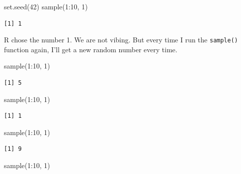 \documentclass[
  letterpaper,
  DIV=11,
  numbers=noendperiod,
  oneside]{scrreprt}
\newenvironment{Shaded}{\begin{snugshade}}{\end{snugshade}}
\newcommand{\DecValTok}[1]{\textcolor[rgb]{0.68,0.00,0.00}{#1}}
\newcommand{\FunctionTok}[1]{\textcolor[rgb]{0.28,0.35,0.67}{#1}}
\newcommand{\NormalTok}[1]{\textcolor[rgb]{0.00,0.23,0.31}{#1}}
\newcommand{\SpecialCharTok}[1]{\textcolor[rgb]{0.37,0.37,0.37}{#1}}
\begin{document}
\begin{Shaded}
\begin{Highlighting}[]
\FunctionTok{set.seed}\NormalTok{(}\DecValTok{42}\NormalTok{)}
\FunctionTok{sample}\NormalTok{(}\DecValTok{1}\SpecialCharTok{:}\DecValTok{10}\NormalTok{, }\DecValTok{1}\NormalTok{)}
\end{Highlighting}
\end{Shaded}

\begin{verbatim}
[1] 1
\end{verbatim}

R chose the number 1. We are not vibing. But every time I run the
\texttt{sample()} function again, I'll get a new random number every
time.

\begin{Shaded}
\begin{Highlighting}[]
\FunctionTok{sample}\NormalTok{(}\DecValTok{1}\SpecialCharTok{:}\DecValTok{10}\NormalTok{, }\DecValTok{1}\NormalTok{)}
\end{Highlighting}
\end{Shaded}

\begin{verbatim}
[1] 5
\end{verbatim}

\begin{Shaded}
\begin{Highlighting}[]
\FunctionTok{sample}\NormalTok{(}\DecValTok{1}\SpecialCharTok{:}\DecValTok{10}\NormalTok{, }\DecValTok{1}\NormalTok{)}
\end{Highlighting}
\end{Shaded}

\begin{verbatim}
[1] 1
\end{verbatim}

\begin{Shaded}
\begin{Highlighting}[]
\FunctionTok{sample}\NormalTok{(}\DecValTok{1}\SpecialCharTok{:}\DecValTok{10}\NormalTok{, }\DecValTok{1}\NormalTok{)}
\end{Highlighting}
\end{Shaded}

\begin{verbatim}
[1] 9
\end{verbatim}

\begin{Shaded}
\begin{Highlighting}[]
\FunctionTok{sample}\NormalTok{(}\DecValTok{1}\SpecialCharTok{:}\DecValTok{10}\NormalTok{, }\DecValTok{1}\NormalTok{)}
\end{Highlighting}
\end{Shaded}
\end{document}
